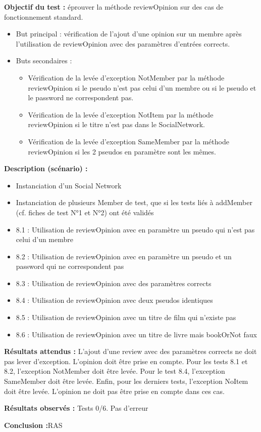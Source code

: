 \documentclass[12pt,a4paper]{report}
\begin{document}
\textbf{Objectif du test :} éprouver la méthode reviewOpinion sur des cas de fonctionnement standard.
\begin{itemize}
	\item	But principal : vérification de l'ajout d'une opinion sur un membre après l'utilisation de reviewOpinion avec des paramètres d'entrées corrects.
	\item	Buts secondaires :
	\begin{itemize}
		\item	Vérification de la levée d'exception NotMember par la méthode reviewOpinion si le pseudo n'est pas celui d'un membre ou si le pseudo et le password ne correspondent pas.
       \item    Vérification de la levée d'exception NotItem par la méthode reviewOpinion si le titre n’est pas dans le SocialNetwork.
	   \item 	Vérification de la levée d'exception SameMember par la méthode reviewOpinion si les 2 pseudos en paramètre sont les mêmes.

	\end{itemize}

\end{itemize}

\textbf{Description (scénario) :}
\begin{itemize}
	\item	Instanciation d'un Social Network
	\item	Instanciation de plusieurs Member de test, que si les tests liés à addMember (cf. fiches de test N°1 et N°2) ont été validés
	\item	8.1 : Utilisation de reviewOpinion avec en paramètre un pseudo qui n'est pas celui d'un membre 
	\item	8.2 : Utilisation de reviewOpinion avec en paramètre un pseudo et un password qui ne correspondent pas
	\item	8.3 : Utilisation de reviewOpinion avec des paramètres corrects
	\item	8.4 : Utilisation de reviewOpinion avec deux pseudos identiques
	\item	8.5 : Utilisation de reviewOpinion avec un titre de film qui n’existe pas
	\item	8.6 : Utilisation de reviewOpinion avec un titre de livre mais bookOrNot faux 

\end{itemize}

\textbf{Résultats attendus :}
	L'ajout d'une review avec des paramètres corrects ne doit pas lever d'exception. L'opinion doit être prise en compte. Pour les tests 8.1 et 8.2, l'exception NotMember doit être levée. Pour le test 8.4, l'exception SameMember doit être levée. Enfin, pour les derniers tests, l'exception NoItem doit être levée. L'opinion ne doit pas être prise en compte dans ces cas.

\textbf{Résultats observés :}
Tests 0/6. Pas d'erreur

\textbf{Conclusion :}RAS
\end{document}

